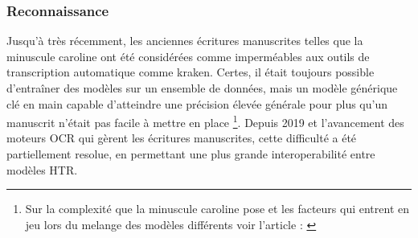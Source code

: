 \documentclass[a4paper, twoside, 12pt]{book}
\begin{document}
\subsubsection{Reconnaissance}

Jusqu'à très récemment, les anciennes écritures manuscrites telles que la minuscule caroline ont été considérées comme imperméables aux outils de transcription automatique comme kraken. Certes, il était toujours possible d'entraîner des modèles sur un ensemble de données, mais un modèle générique \og{} clé en main \fg{} capable d'atteindre une précision élevée générale pour plus qu'un manuscrit n'était pas facile à mettre en place \footnote{Sur la complexité que la minuscule caroline pose et les facteurs qui entrent en jeu lors du melange des modèles différents voir l'article : \cite{hawk2018modelling}}. Depuis 2019 et l'avancement des moteurs OCR qui gèrent les écritures manuscrites, cette difficulté a été partiellement resolue, en permettant une plus grande interoperabilité entre modèles HTR. \\
\end{document}

